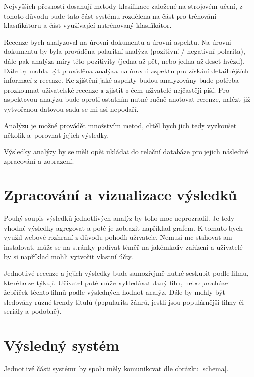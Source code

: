 Nejvyšších přesností dosahují metody klasifikace založené na strojovém učení, z tohoto důvodu bude tato část systému rozdělena na část pro trénování klasifikátoru a část využívající natrénovaný klasifikátor. 

Recenze bych analyzoval na úrovni dokumentu a úrovni aspektu. Na úrovni dokumentu by byla prováděna polaritní analýza (pozitivní / negativní polarita), dále pak analýza míry této pozitivity (jedna až pět, nebo jedna až deset hvězd). Dále by mohla být prováděna analýza na úrovni aspektu pro získání detailnějších informací z recenze. Ke zjištění jaké aspekty budou analyzovány bude potřeba prozkoumat uživatelské recenze a zjistit o čem uživatelé nejčastěji píší. Pro aspektovou analýzu bude oproti ostatním nutné ručně anotovat recenze, nalézt již vytvořenou datovou sadu se mi asi nepodaří.

Analýzu je možné provádět množstvím metod, chtěl bych jich tedy vyzkoušet několik a~porovnat jejich výsledky. 

Výsledky analýzy by se měli opět ukládat do relační databáze pro jejich následné zpracování a zobrazení.

\section{Zpracování a vizualizace výsledků}
Pouhý soupis výsledků jednotlivých analýz by toho moc neprozradil. Je tedy vhodné výsledky agregovat a poté je zobrazit například grafem. K tomuto bych využil webové rozhraní z důvodu pohodlí uživatele. Nemusí nic stahovat ani instalovat, může se na stránky podívat téměř na jakémkoliv zařízení a uživatelé by si například mohli vytvořit vlastní účty.

Jednotlivé recenze a jejich výsledky bude samozřejmě nutné seskupit podle filmu, kterého se týkají. Uživatel poté může vyhledávat daný film, nebo procházet žebříček těchto filmů podle výsledných hodnot analýz. Dále by mohly být sledovány různé trendy titulů (popularita žánrů, jestli jsou populárnější filmy či seriály a podobně). 

\section{Výsledný systém}
Jednotlivé části systému by spolu měly komunikovat dle obrázku \ref{schema}.

